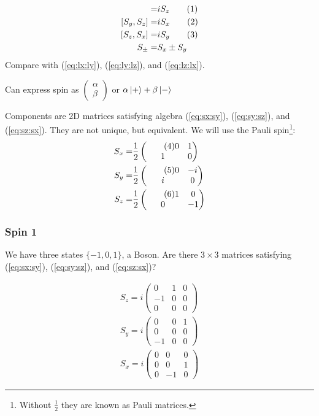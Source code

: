 \documentclass[]{article}
\newcommand\numberthis{\addtocounter{equation}{1}\tag{\theequation}}
\begin{document}
\begin{align*}
	[S_x,S_y] =& i S_z \numberthis \label{eq:sx:sy}\\
	[S_y,S_z] =& i S_x  \numberthis \label{eq:sy:sz}\\
	[S_z,S_x] =& i S_y  \numberthis \label{eq:sz:sx}\\
	S_\pm =& S_x \pm S_y
\end{align*}
Compare with (\ref{eq:lx:ly}),  (\ref{eq:ly:lz}), and  (\ref{eq:lz:lx}).

Can express spin as $\begin{pmatrix}
\alpha\\
\beta
\end{pmatrix}$ or $\alpha\ket{+} + \beta\ket{-}$ 

Components are 2D matrices satisfying algebra (\ref{eq:sx:sy}), (\ref{eq:sy:sz}), and (\ref{eq:sz:sx}). They are not unique, but equivalent. We will use the Pauli spin\footnote{Without $\frac{1}{2}$ they are known as Pauli matrices.}:
\begin{align*}
	S_x =& \frac{1}{2}\begin{pmatrix} \numberthis \label{eq:pauli:x}
		0&1\\
		1&0
	\end{pmatrix}\\
	S_y =& \frac{1}{2}\begin{pmatrix} \numberthis \label{eq:pauli:y}
		0&-i\\
		i&0
	\end{pmatrix}\\
	S_z =& \frac{1}{2}\begin{pmatrix} \numberthis \label{eq:pauli:z}
		1&0\\
		0&-1
	\end{pmatrix}
\end{align*}

\subsubsection{Spin 1}

We have three states $\{-1,0,1\}$, a Boson. Are there $3\times3$ matrices satisfying (\ref{eq:sx:sy}), (\ref{eq:sy:sz}), and (\ref{eq:sz:sx})?

\begin{align*}
	S_z = i \begin{pmatrix}
		0&1&0\\
		-1&0&0\\
		0&0&0
	\end{pmatrix}\\
	S_y = i \begin{pmatrix}
		0&0&1\\
		0&0&0\\
		-1&0&0
	\end{pmatrix}\\
	S_x = i \begin{pmatrix}
		0&0&0\\
		0&0&1\\
		0&-1&0
	\end{pmatrix}
\end{align*}
\end{document}

